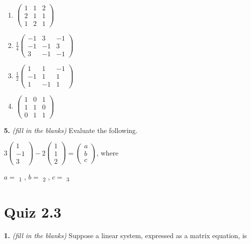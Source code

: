 \documentclass[10pt,a4paper]{article}
\begin{document}
\begin{enumerate}[label=(\Alph*)]
\item \(\begin{pmatrix}1&1&2\\2&1&1\\1&2&1\end{pmatrix}\)
\item \(\frac{1}{4}\begin{pmatrix}-1&3&-1\\-1&-1&3\\3&-1&-1\end{pmatrix}\)
\item \(\frac{1}{2}\begin{pmatrix}1&1&-1\\-1&1&1\\1&-1&1\end{pmatrix}\)
\item \(\begin{pmatrix}1&0&1\\1&1&0\\0&1&1\end{pmatrix}\)
\end{enumerate}
\smallskip
\textbf{5.} \textit{(fill in the blanks)} Evaluate the following.

\(3\begin{pmatrix}1\\-1\\3\end{pmatrix}-2\begin{pmatrix}1\\1\\2\end{pmatrix}=\begin{pmatrix}a\\b\\c\end{pmatrix}\), where

\(a=\) \underline{\hspace{1.2cm}}\textsubscript{1} 
, \(b=\) \underline{\hspace{1.2cm}}\textsubscript{2} 
, \(c=\) \underline{\hspace{1.2cm}}\textsubscript{3}

\smallskip
\section{Quiz 2.3}
\textbf{1.} \textit{(fill in the blanks)} Suppose a linear system, expressed as a matrix equation, is
\end{document}
